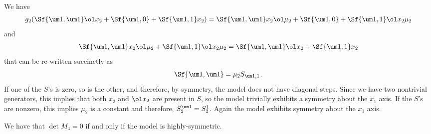 We have
\begin{align}
	g_2 (\Sf{\um 1, \um 1}\ol x_2+\Sf{\um 1,0}+\Sf{\um 1,1}x_2) = \Sf{\um 1, \um 1}x_2 \ol \mu_2+\Sf{\um 1,0}+\Sf{\um 1,1}\ol x_2\mu_2
\end{align}
and
\begin{align}
	\Sf{\um 1, \um 1}x_2 \ol \mu_2+\Sf{\um 1,1}\ol x_2\mu_2 = \Sf{\um 1, \um 1}\ol x_2+\Sf{\um 1,1}x_2
\end{align}
that can be re-written succinctly as
\begin{align}
	\Sf{\um 1, \um 1} = \mu_2 S_{\um 1,1}\,.
\end{align}
If one of the $S$'s is zero, so is the other, and therefore, by symmetry, the model does not have diagonal steps. Since we have two nontrivial generators, this implies that both $x_2$ and $\ol x_2$ are present in $S$, so the model trivially exhibits a symmetry about the $x_1$ axis. If the $S$'s are nonzero, this implies $\mu_2$ is a constant and therefore, $S_2^{\um 1} = S_2^1$. Again the model exhibits symmetry about the $x_1$ axis. 
\begin{theorem} We have that $\det M_4 = 0$ if and only if the model is highly-symmetric.
\end{theorem}

